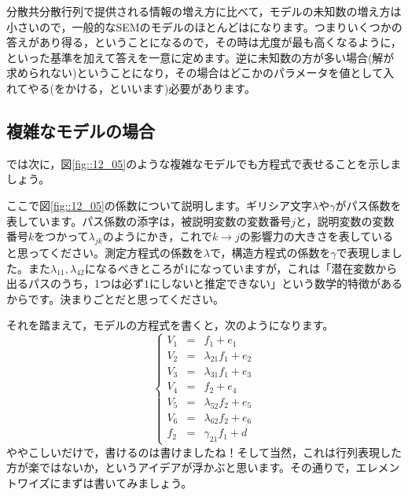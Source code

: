 \documentclass{ltjsbook}
\begin{document}
分散共分散行列で提供される情報の増え方に比べて，モデルの未知数の増え方は小さいので，一般的なSEMのモデルのほとんどはになります。つまりいくつかの答えがあり得る，ということになるので，その時は尤度が最も高くなるように，といった基準を加えて答えを一意に定めます。逆に未知数の方が多い場合(解が求められない)ということになり，その場合はどこかのパラメータを値として入れてやる(をかける，といいます)必要があります。

\subsection{複雑なモデルの場合}

では次に，図\ref{fig::12_05}のような複雑なモデルでも方程式で表せることを示しましょう。

ここで図\ref{fig::12_05}の係数について説明します。ギリシア文字$\lambda$や$\gamma$がパス係数を表しています。パス係数の添字は，被説明変数の変数番号$j$と，説明変数の変数番号$k$をつかって$\lambda_{jk}$のようにかき，これで$k \to j$の影響力の大きさを表していると思ってください。測定方程式の係数を$\lambda$で，構造方程式の係数を$\gamma$で表現しました。また$\lambda_{11},\lambda_{42}$になるべきところが$1$になっていますが，これは「潜在変数から出るパスのうち，1つは必ず$1$にしないと推定できない」という数学的特徴があるからです。決まりごとだと思ってください。

それを踏まえて，モデルの方程式を書くと，次のようになります。
\[ \left \{
    \begin{array}{rcl}
        V_1 &=& f_1 + e_1\\
        V_2 &=& \lambda_{21}f_1 + e_2\\
        V_3 &=& \lambda_{31}f_1 + e_3\\
        V_4 &=& f_2 + e_4\\
        V_5 &=& \lambda_{52}f_2 + e_5\\
        V_6 &=& \lambda_{62}f_2 + e_6\\
        f_2 &=& \gamma_{21}f_1 + d
    \end{array}
    \right .
\]
ややこしいだけで，書けるのは書けましたね！そして当然，これは行列表現した方が楽ではないか，というアイデアが浮かぶと思います。その通りで，エレメントワイズにまずは書いてみましょう。
\end{document}
